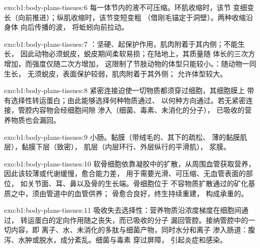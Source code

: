 \begin{solution}{exo:b1:body-plans-tissues:6}
每一体节内的液不可压缩。环肌收缩时，该节
变细变长（向前推进）；纵肌收缩时，该节变短变粗
（借刚毛锚定于洞壁）。两种收缩沿身体
向后传播的波，
将蚯蚓向前拉动。
\end{solution}

\begin{solution}{exo:b1:body-plans-tissues:7}
：坚硬、起保护作用，肌肉附着于其内侧；不能生长，
因此动物必须蜕皮，蜕皮期间柔软易损；在陆地上，其质量随
体长的三次方增加，而强度仅随二次方增加，
这限制了节肢动物的体型只能较小。：随动物一同生长，
无须蜕皮，表面保护较弱，肌肉附着于其外侧；
允许体型较大。
\end{solution}

\begin{solution}{exo:b1:body-plans-tissues:8}
紧密连接迫使一切物质都须穿过细胞，其细胞膜上
带有选择性转运蛋白；由此能够选择何种物质通过、
以何种方向通过。若无紧密连接，管腔内容物会经细胞间隙
渗入（细菌、毒素、未消化的分子），
已吸收的营养物质也会漏回。
\end{solution}

\begin{solution}{exo:b1:body-plans-tissues:9}
小肠。黏膜（带绒毛的、其下的疏松、
薄的黏膜肌层），黏膜下层（致密），
肌层（内层环行、外层纵行的平滑肌），
浆膜。
\end{solution}

\begin{solution}{exo:b1:body-plans-tissues:10}
软骨细胞依靠凝胶中的扩散，从周围血管获取营养，
因此该较薄或代谢缓慢，愈合能力差，
用于需要光滑、可压缩、无血管表面的部位，
如关节面、耳、鼻以及骨的生长端。骨细胞位于
不容物质扩散通过的矿化基质之中，须由管道中的血管供养；
骨愈合良好，终生持续重建，
构成承重的。
\end{solution}

\begin{solution}{exo:b1:body-plans-tissues:11}
吸收失去选择性：营养物质沿浓度梯度在细胞间通过，
转运蛋白的定向作用随之丧失，而已吸收的分子
漏回管腔。接纳管腔中的一切内容，即
离子、水、未消化的多肽与细菌产物，同时水分和离子
渗入肠道：腹泻、水肿或脱水，成分紊乱。细菌与毒素
穿过屏障，
引起炎症和感染。
\end{solution}

